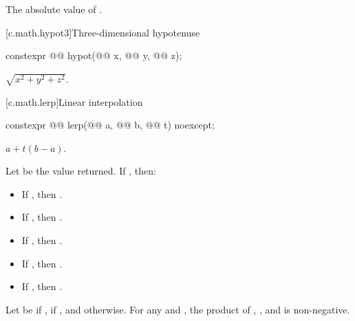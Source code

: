 \begin{itemdescr}
\pnum
\returns
The absolute value of .
\end{itemdescr}


[c.math.hypot3]{Three-dimensional hypotenuse}

%
\begin{itemdecl}
constexpr @@ hypot(@@ x, @@ y,
                                    @@ z);
\end{itemdecl}

\begin{itemdescr}
\pnum
\returns
$\sqrt{x^2+y^2+z^2}$.
\end{itemdescr}

[c.math.lerp]{Linear interpolation}

%
\begin{itemdecl}
constexpr @@ lerp(@@ a, @@ b,
                                   @@ t) noexcept;
\end{itemdecl}
\begin{itemdescr}
\pnum
\returns
$a+t(b-a)$.

\pnum
\remarks
Let  be the value returned.
If , then:
\begin{itemize}
\item If , then .
\item If , then .
\item If , then .
\item If , then .
\item If , then .
\end{itemize}
Let  be  if ,
 if , and  otherwise.
For any  and , the product of
,
, and
is non-negative.
\end{itemdescr}


